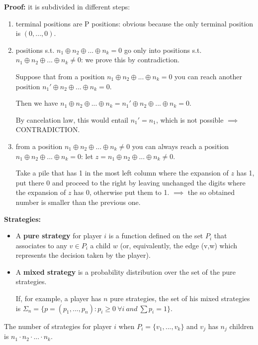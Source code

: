 \noindent \textbf{Proof:} it is subdivided in different steps:
\begin{enumerate}
	\item terminal positions are P positions: obvious because the only terminal position is $(0,...,0)$.
	
	\item positions s.t. $n_1 \oplus n_2 \oplus ... \oplus n_k = 0$ go only into positions s.t. $n_1 \oplus n_2 \oplus ... \oplus n_k \neq 0$: we prove this by contradiction.
	
	\noindent Suppose that from a position $n_1 \oplus n_2 \oplus ... \oplus n_k = 0$ you can reach another position $n_1' \oplus n_2 \oplus ... \oplus n_k = 0$.
	
	\noindent Then we have $n_1 \oplus n_2 \oplus ... \oplus n_k = n_1' \oplus n_2 \oplus ... \oplus n_k = 0$.
	
	\noindent By cancelation law, this would entail $n_1' = n_1$, which is not possible $\implies$ CONTRADICTION.
	
	\item from a position $n_1 \oplus n_2 \oplus ... \oplus n_k \neq 0$ you can always reach a position $n_1 \oplus n_2 \oplus ... \oplus n_k = 0$: let $z = n_1 \oplus n_2 \oplus ... \oplus n_k \neq 0$.
	
	\noindent Take a pile that has 1 in the most left column where the expansion of $z$ has 1, put there 0 and proceed to the right by leaving unchanged the digits where the expansion of $z$ has 0, otherwise put them to 1. $\implies$ the so obtained number is smaller than the previous one.
\end{enumerate}

\bigskip
\noindent \textbf{Strategies:}
\begin{itemize}
	\item A \textbf{pure strategy} for player $i$ is a function defined on the 
	set $P_i$ that associates to any $v \in P_i$ a child $w$ (or, equivalently, 
	the edge (v,w) which represents the decision taken by the player).
	\item A \textbf{mixed strategy} is a probability distribution over the set 
	of the pure strategies.

	\noindent If, for example, a player has $n$ pure strategies, the set of his 
	mixed strategies is $\Sigma_n = \{p = (p_1,...,p_n): p_i \geq 0 
	~\forall i ~and~ \sum{p_i} = 1\}$.
\end{itemize}
The number of strategies for player $i$ when $P_i = \{v_1,...,v_k\}$ and $v_j$ 
has $n_j$ children is $n_1 \cdot n_2 \cdot ... \cdot n_k$.

